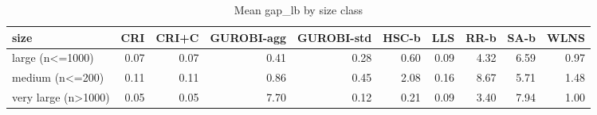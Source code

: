 \begin{table}[htbp]
\centering
\small
\caption{Mean gap\_lb by size class}
\label{tab:E4b_equal_budgets_60s_b60_by_size}
\begin{tabular}{lrrrrrrrrr}
\toprule
size & CRI & CRI+C & GUROBI-agg & GUROBI-std & HSC-b & LLS & RR-b & SA-b & WLNS \\
\midrule
large (n<=1000) & 0.07 & 0.07 & 0.41 & 0.28 & 0.60 & 0.09 & 4.32 & 6.59 & 0.97 \\
medium (n<=200) & 0.11 & 0.11 & 0.86 & 0.45 & 2.08 & 0.16 & 8.67 & 5.71 & 1.48 \\
very large (n>1000) & 0.05 & 0.05 & 7.70 & 0.12 & 0.21 & 0.09 & 3.40 & 7.94 & 1.00 \\
\bottomrule
\end{tabular}
\end{table}
